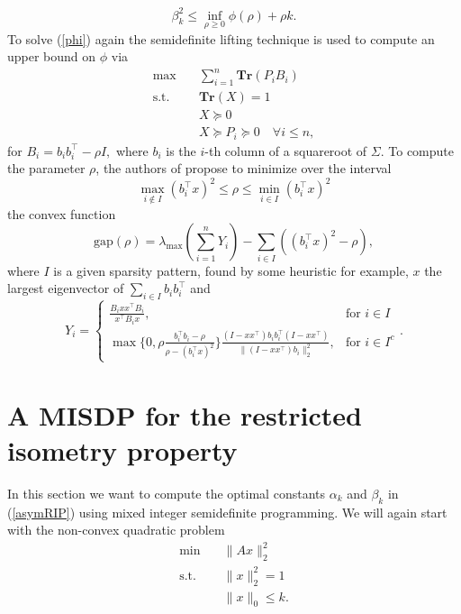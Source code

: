 \documentclass{elsarticle}
\newcommand{\T}{^{\top}}
\begin{document}
\begin{equation*}
 \beta_k^2 \leq \inf_{\rho \geq 0} \phi(\rho) + \rho k.
\end{equation*}
To solve (\ref{phi}) again the semidefinite lifting technique is used to compute an upper bound on $\phi$ via
\begin{align}\label{Asp08}
 \text{max} \quad & \sum_{i=1}^n\textbf{Tr}(P_iB_i) \nonumber \\
 \text{s.t.} \quad & \textbf{Tr}(X) = 1 \nonumber \\
 & X \succeq 0 \tag{Asp08} \\
 & X \succeq P_i \succeq 0 \quad \forall i \leq n, \nonumber
\end{align}
for $B_i = b_ib_i\T - \rho I,$ where $b_i$ is the $i$-th column of a squareroot of $\Sigma$. To compute the parameter $\rho$, the authors of \cite{Asp07} propose to minimize over the interval
\begin{equation*}
 \max_{i \notin I} (b_i\T x)^2 \leq \rho \leq  \min_{i \in I} (b_i\T x)^2
\end{equation*}
the convex function
\begin{equation*}
 \text{gap}(\rho) = \lambda_{\max} \left( \sum_{i=1}^n Y_i \right) -
 \sum_{i \in I} ((b_i\T x)^2 - \rho),
\end{equation*}
where $I$ is a given sparsity pattern, found by some heuristic for example, $x$ the largest eigenvector of $\sum_{i \in I} b_i b_i\T$ and
\begin{equation*}
 Y_i = \begin{cases}\frac{B_ixx\T B_i}{x\T B_ix}, & \text{for } i \in I \\
   \max\{0, \rho \frac{b_i\T b_i - \rho}{\rho - (b_i\T x)^2} \} \frac{(I-xx\T)b_ib_i\T(I-xx\T)}{\|(I-xx\T)b_i\|_2^2}, & \text{for } i \in I^c\end{cases}. 
\end{equation*}


\section{A MISDP for the restricted isometry property}

In this section we want to compute the optimal constants $\alpha_k$ and $\beta_k$ in (\ref{asymRIP}) using mixed integer semidefinite programming. We will again start with the non-convex quadratic problem
\begin{align}\label{QP2}
 \text{min} \quad & \|Ax\|_2^2 \nonumber \\
 \text{s.t.} \quad & \|x\|_2^2 = 1 \tag{QP} \\
 & \|x\|_0 \leq k. \nonumber
\end{align}
\end{document}
